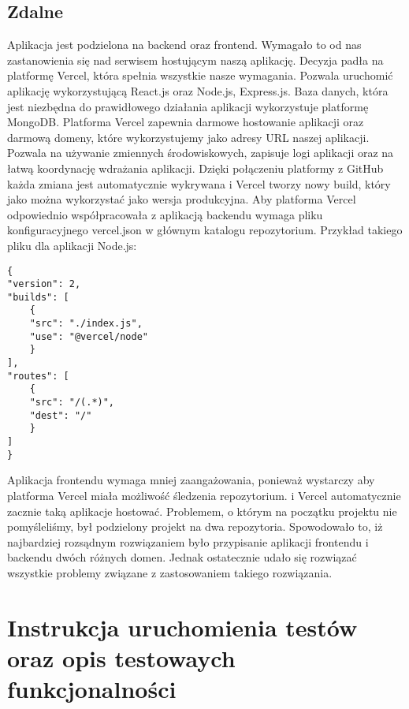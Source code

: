 \documentclass{article}
\begin{document}
        \subsection{Zdalne}
        Aplikacja jest podzielona na backend oraz frontend. Wymagało to od nas zastanowienia się nad serwisem hostującym naszą aplikację. Decyzja padła na platformę Vercel, która spełnia wszystkie nasze wymagania. Pozwala uruchomić aplikację wykorzystującą React.js oraz Node.js, Express.js. Baza danych, która jest niezbędna do prawidłowego działania aplikacji wykorzystuje platformę MongoDB. 
        Platforma Vercel zapewnia darmowe hostowanie aplikacji oraz darmową domeny, które wykorzystujemy jako adresy URL naszej aplikacji. Pozwala na używanie zmiennych środowiskowych, zapisuje logi aplikacji oraz na łatwą koordynację wdrażania aplikacji. Dzięki połączeniu platformy z GitHub każda zmiana jest automatycznie wykrywana i Vercel tworzy nowy build, który jako można wykorzystać jako wersja produkcyjna. 
        Aby platforma Vercel odpowiednio współpracowała z aplikacją backendu wymaga pliku konfiguracyjnego vercel.json w głównym katalogu repozytorium. Przykład takiego pliku dla aplikacji Node.js:
        \begin{lstlisting}
{
"version": 2,
"builds": [
    {
    "src": "./index.js",
    "use": "@vercel/node"
    }
],
"routes": [
    {
    "src": "/(.*)",
    "dest": "/"
    }
]
}
        \end{lstlisting}
        Aplikacja frontendu wymaga mniej zaangażowania, ponieważ wystarczy aby platforma Vercel miała możliwość śledzenia repozytorium. i Vercel automatycznie zacznie taką aplikacje hostować. 
        Problemem, o którym na początku projektu nie pomyśleliśmy, był podzielony projekt na dwa repozytoria. Spowodowało to, iż najbardziej rozsądnym rozwiązaniem było przypisanie aplikacji frontendu i backendu dwóch różnych domen. Jednak ostatecznie udało się rozwiązać wszystkie problemy związane z zastosowaniem takiego rozwiązania.
    
    \section{Instrukcja uruchomienia testów oraz opis testowaych funkcjonalności}
\end{document}
